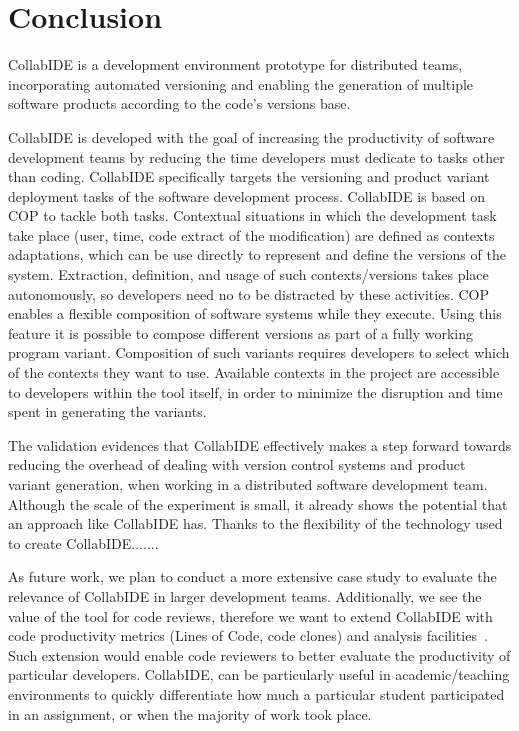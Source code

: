 
\section{Conclusion}
\label{sec:conclusion}

CollabIDE is a development environment prototype for distributed teams, incorporating automated versioning and enabling the generation of multiple software products according to the code's versions base.

CollabIDE is developed with the goal of increasing the productivity of software development teams by reducing the time developers must dedicate to tasks other than coding. CollabIDE specifically targets the versioning and product variant deployment tasks of the software development process. CollabIDE is based on \ac{COP} to tackle both tasks. Contextual situations in which the development task take place (\eg user, time, code extract of the modification) are defined as contexts adaptations, which can be use directly to represent and define the versions of the system. Extraction, definition, and usage of such contexts/versions takes place autonomously, so developers need no to be distracted by these activities. 
\ac{COP} enables a flexible composition of software systems while they execute. Using this feature it is possible to compose different versions as part of a fully working program variant. Composition of such variants requires developers to select which of the contexts they want to use. Available contexts in the project are accessible to developers within the tool itself, in order to minimize the disruption and time spent in generating the variants.

The validation evidences that CollabIDE effectively makes a step forward towards reducing the overhead of dealing with version control systems and product variant generation, when working in a distributed software development team.
Although the scale of the experiment is small, it already shows the potential that an approach like 
CollabIDE has. Thanks to the flexibility of the technology used to create CollabIDE.......

As future work, we plan to conduct a more extensive case study to evaluate the relevance of CollabIDE 
in larger development teams. Additionally, we see the value of the tool for code reviews, therefore we 
want to extend CollabIDE with code productivity metrics (\eg Lines of Code, code clones) and analysis 
facilities~\cite{lienhard12}. Such extension would enable code reviewers to better evaluate the 
productivity of particular developers. CollabIDE, can be particularly useful in academic/teaching 
environments to quickly differentiate how much a particular student participated in an assignment, or 
when the majority of work took place.

\endinput
